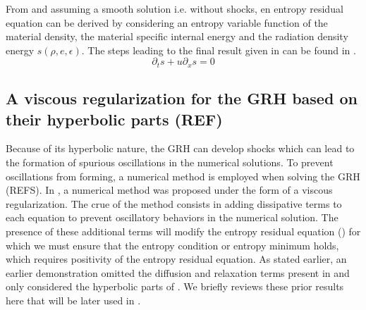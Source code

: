 \documentclass[review]{elsarticle}
\begin{document}
From  and assuming a smooth solution i.e. without shocks, en entropy residual equation can be derived by considering an entropy variable function of the material density, the material specific internal energy and the radiation density energy $s(\rho, e, \epsilon)$. The steps leading to the final result given in  can be found in \cite{our_jcp_radhy_paper}.
%
\begin{equation}\label{eq:GRH-entropy}
\partial_t s + u \partial_x s = 0
\end{equation}
%
%
\subsection{A viscous regularization for the GRH based on their hyperbolic parts (REF)}\label{sec:VR_old}
%
Because of its hyperbolic nature, the GRH can develop shocks which can lead to the formation of spurious oscillations in the numerical solutions. To prevent oscillations from forming, a numerical method is employed when solving the GRH (REFS). In \cite{our_jcp_radhy_paper}, a numerical method was proposed under the form of a viscous regularization. 
The crue of the method consists in adding dissipative terms to each equation to prevent oscillatory behaviors in the numerical solution. The presence of these additional terms will modify the entropy residual equation () for which we must ensure that the entropy condition or entropy minimum holds, which requires positivity of the entropy residual equation. 
As stated earlier, an earlier demonstration omitted the diffusion and relaxation terms present in  and only considered the hyperbolic parts of . We briefly reviews these prior results here that will be later used in . 
\end{document}

